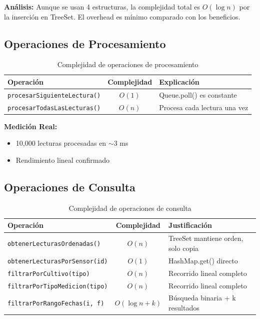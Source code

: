 \documentclass[12pt,a4paper]{article}
\begin{document}
\textbf{Análisis:} Aunque se usan 4 estructuras, la complejidad total es $O(\log n)$ por la inserción en TreeSet. El overhead es mínimo comparado con los beneficios.

\subsection{Operaciones de Procesamiento}

\begin{table}[h]
\centering
\begin{tabular}{|l|c|p{7cm}|}
\hline
\rowcolor{agrogreen!20}
\textbf{Operación} & \textbf{Complejidad} & \textbf{Explicación} \\
\hline
\texttt{procesarSiguienteLectura()} & $O(1)$ & Queue.poll() es constante \\
\texttt{procesarTodasLasLecturas()} & $O(n)$ & Procesa cada lectura una vez \\
\hline
\end{tabular}
\caption{Complejidad de operaciones de procesamiento}
\label{tab:complejidad-procesamiento}
\end{table}

\textbf{Medición Real:}
\begin{itemize}
    \item 10,000 lecturas procesadas en $\sim$3 ms
    \item Rendimiento lineal confirmado
\end{itemize}

\subsection{Operaciones de Consulta}

\begin{table}[h]
\centering
\begin{tabular}{|l|c|p{6cm}|}
\hline
\rowcolor{agrogreen!20}
\textbf{Operación} & \textbf{Complejidad} & \textbf{Justificación} \\
\hline
\texttt{obtenerLecturasOrdenadas()} & $O(n)$ & TreeSet mantiene orden, solo copia \\
\texttt{obtenerLecturasPorSensor(id)} & $O(1)$ & HashMap.get() directo \\
\texttt{filtrarPorCultivo(tipo)} & $O(n)$ & Recorrido lineal completo \\
\texttt{filtrarPorTipoMedicion(tipo)} & $O(n)$ & Recorrido lineal completo \\
\texttt{filtrarPorRangoFechas(i, f)} & $O(\log n + k)$ & Búsqueda binaria + k resultados \\
\hline
\end{tabular}
\caption{Complejidad de operaciones de consulta}
\label{tab:complejidad-consulta}
\end{table}
\end{document}
